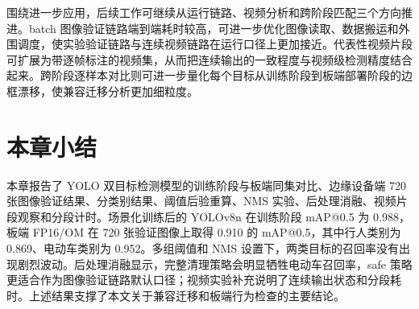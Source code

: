围绕进一步应用，后续工作可继续从运行链路、视频分析和跨阶段匹配三个方向推进。batch 图像验证链路端到端耗时较高，可进一步优化图像读取、数据搬运和外围调度，使实验验证链路与连续视频链路在运行口径上更加接近。代表性视频片段可扩展为带逐帧标注的视频集，从而把连续输出的一致程度与视频级检测精度结合起来。跨阶段逐样本对比则可进一步量化每个目标从训练阶段到板端部署阶段的边框漂移，使兼容迁移分析更加细粒度。

\section{本章小结}

本章报告了 YOLO 双目标检测模型的训练阶段与板端同集对比、边缘设备端 720 张图像验证结果、分类别结果、阈值后验重算、NMS 实验、后处理消融、视频片段观察和分段计时。场景化训练后的 YOLOv8n 在训练阶段 mAP@0.5 为 0.988，板端 FP16/OM 在 720 张验证图像上取得 0.910 的 mAP@0.5，其中行人类别为 0.869、电动车类别为 0.952。多组阈值和 NMS 设置下，两类目标的召回率没有出现剧烈波动。后处理消融显示，完整清理策略会明显牺牲电动车召回率，safe 策略更适合作为图像验证链路默认口径；视频实验补充说明了连续输出状态和分段耗时。上述结果支撑了本文关于兼容迁移和板端行为检查的主要结论。

